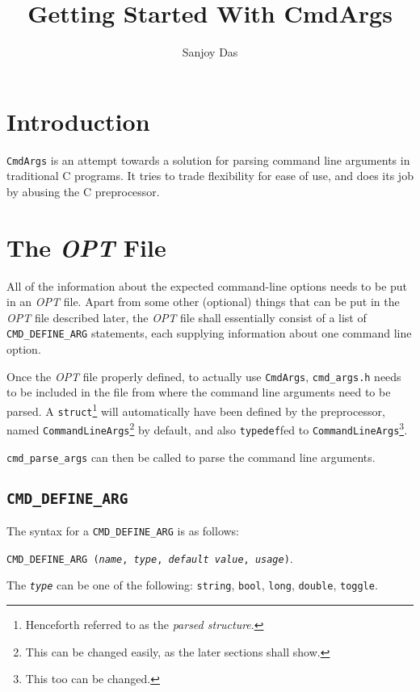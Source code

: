 \documentclass[a4paper,11pt]{article}
\title{Getting Started With CmdArgs}
\author{Sanjoy Das}
\begin{document}
\maketitle
\newpage

\section{Introduction}

\texttt{CmdArgs} is an attempt towards a solution for parsing command line arguments in traditional C programs. It tries to trade flexibility for ease of use, and does its job by abusing the C preprocessor.

\section{The \textit{OPT} File}

All of the information about the expected command-line options needs to be put in an \textit{OPT} file. Apart from some other (optional) things that can be put in the \textit{OPT} file described later, the \textit{OPT} file shall essentially consist of a list of \texttt{CMD\_DEFINE\_ARG} statements, each supplying information about one command line option.

Once the \textit{OPT} file properly defined, to actually use \texttt{CmdArgs}, \texttt{cmd\_args.h} needs to be included in the file from where  the command line arguments need to be parsed. A \texttt{struct}\footnote{Henceforth referred to as the \textit{parsed structure}.} will automatically have been defined by the preprocessor, named \texttt{CommandLineArgs}\footnote{This can be changed easily, as the later sections shall show.} by default, and also \texttt{typedef}fed to \texttt{CommandLineArgs}\footnote{This too can be changed.}.

\texttt{cmd\_parse\_args} can then be called to parse the command line arguments.

\subsection{\texttt{CMD\_DEFINE\_ARG}}

The syntax for a \texttt{CMD\_DEFINE\_ARG} is as follows:

\texttt{CMD\_DEFINE\_ARG (\textit{name}, \textit{type}, \textit{default value}, \textit{usage})}.

The \texttt{\textit{type}} can be one of the following: \texttt{string}, \texttt{bool}, \texttt{long}, \texttt{double}, \texttt{toggle}.
\end{document}
